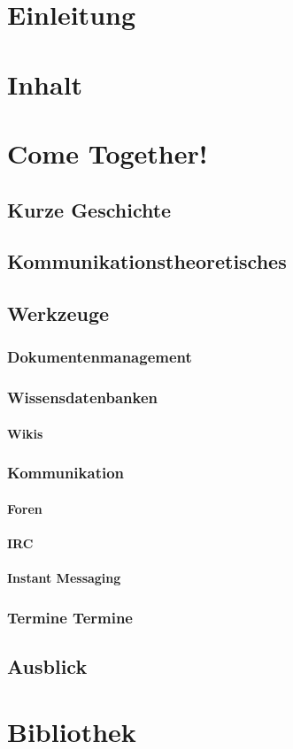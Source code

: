 \documentclass[a4paper,10pt]{book}
\begin{document}
\part{Einleitung}
\part{Inhalt}
\tableofcontents
\part{Come Together!}
\chapter{Kurze Geschichte}
\chapter{Kommunikationstheoretisches}
\chapter{Werkzeuge}
\section{Dokumentenmanagement}
\section{Wissensdatenbanken}
\subsection{Wikis}
\section{Kommunikation}
\subsection{Foren}
\subsection{IRC}
\subsection{Instant Messaging}
\section{Termine Termine}
\chapter{Ausblick}
\part{Bibliothek}
\end{document}
